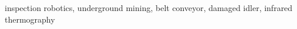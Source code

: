 \documentclass[3p,times,12pt]{elsarticle}
\begin{document}
\begin{frontmatter}
\begin{abstract}

\end{abstract}

\begin{keyword}
inspection robotics, underground mining, belt conveyor, damaged idler, infrared thermography 
\end{keyword}

\end{frontmatter}

\linenumbers
\end{document}
